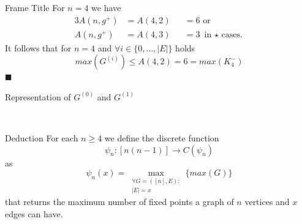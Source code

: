 \documentclass{beamer}
\begin{document}
\begin{frame}{Frame Title}
\justifying
    For $n=4$ we have
    \vspace{-0.5em}
    \begin{alignat*}{3}
        A(n,g^+) &= A(4,2) &&= 6 \text{ or }\\
        A(n,g^+) &= A(4,3) &&= 3 \text{ in $\star$ cases.}
    \end{alignat*}
    It follows that for $n=4$ and $\forall i \in \{0,\dots,|E|\}$ holds
    \[
        max(G^{(i)}) \leq A(4,2) = 6 = max(K_4^-)
    \]
    \hfill $\blacksquare$
\end{frame}

\begin{frame}{Representation of $G^{(0)}$ and $G^{(1)}$}
    \begin{figure}
    	\centering
    	\ \ \ \ 
    	\label{fig:comparison}
    \end{figure}
\end{frame}

\begin{frame}{Deduction}
    \justifying
    For each $n \geq 4$ we define the discrete function
    \[
        \psi_n : [n(n-1)] \to C(\psi_n)
    \]
    as
    \[
    \psi_n(x) = \max_{\substack{\forall G = ([n], E) :\\
    |E| = x}} \{ max(G) \}
    \]
    that returns the maximum number of fixed points a graph of $n$ vertices and $x$ edges can have.
\end{frame}
\end{document}
